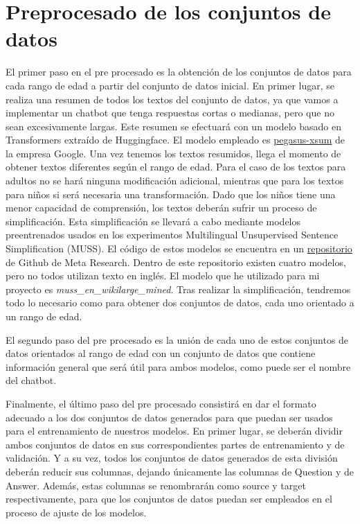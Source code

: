 \section{Preprocesado de los conjuntos de datos} \label{sec:preprocesado_conj_datos}

El primer paso en el pre procesado es la obtención de los conjuntos de datos para cada rango de edad a partir del conjunto de datos inicial. En primer lugar, se realiza una resumen de todos los textos del conjunto de datos, ya que vamos a implementar un chatbot que tenga respuestas cortas o medianas, pero que no sean excesivamente largas. Este resumen se efectuará con un modelo basado en Transformers extraído de Huggingface. El modelo empleado es \href{https://huggingface.co/google/pegasus-xsum}{pegasus-xsum} de la empresa Google. Una vez tenemos los textos resumidos, llega el momento de obtener textos diferentes según el rango de edad. Para el caso de los textos para adultos no se hará ninguna modificación adicional, mientras que para los textos para niños si será necesaria una transformación. Dado que los niños tiene una menor capacidad de comprensión, los textos deberán sufrir un proceso de simplificación. Esta simplificación se llevará a cabo mediante modelos preentrenados usados en los experimentos Multilingual Unsupervised Sentence Simplification (MUSS). El código de estos modelos se encuentra en un \href{https://github.com/facebookresearch/muss}{repositorio} de Github de Meta Research. Dentro de este repositorio existen cuatro modelos, pero no todos utilizan texto en inglés. El modelo que he utilizado para mi proyecto es \textit{muss\_en\_wikilarge\_mined}. Tras realizar la simplificación, tendremos todo lo necesario como para obtener dos conjuntos de datos, cada uno orientado a un rango de edad.

El segundo paso del pre procesado es la unión de cada uno de estos conjuntos de datos orientados al rango de edad con un conjunto de datos que contiene información general que será útil para ambos modelos, como puede ser el nombre del chatbot.

Finalmente, el último paso del pre procesado consistirá en dar el formato adecuado a los dos conjuntos de datos generados para que puedan ser usados para el entrenamiento de nuestros modelos. En primer lugar, se deberán dividir ambos conjuntos de datos en sus correspondientes partes de entrenamiento y de validación. Y a su vez, todos los conjuntos de datos generados de esta división deberán reducir sus columnas, dejando únicamente las columnas de Question y de Answer. Además, estas columnas se renombrarán como source y target respectivamente, para que los conjuntos de datos puedan ser empleados en el proceso de ajuste de los modelos.


